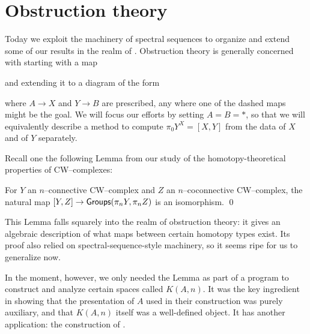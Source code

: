 \section{Obstruction theory}\label{ObstructionSection}

Today we exploit the machinery of spectral sequences to organize and extend some of our results in the realm of .
Obstruction theory is generally concerned with starting with a map
\begin{center}
\end{center}
and extending it to a diagram of the form
\begin{center}
\end{center}
where $A \to X$ and $Y \to B$ are prescribed, any where one of the dashed maps might be the goal.
We will focus our efforts by setting $A = B = *$, so that we will equivalently describe a method to compute $\pi_0 Y^X = [X, Y]$ from the data of $X$ and of $Y$ separately.

Recall one the following Lemma from our study of the homotopy-theoretical properties of CW--complexes:
\begin{lemma}
For $Y$ an $n$--connective CW--complex and $Z$ an $n$--coconnective CW--complex,
the natural map $[Y, Z] \to \mathsf{Groups}(\pi_n Y, \pi_n Z)$ is an isomorphism. \qed
\end{lemma}

\noindent
This Lemma falls squarely into the realm of obstruction theory: it gives an algebraic description of what maps between certain homotopy types exist.
Its proof also relied on spectral-sequence-style machinery, so it seems ripe for us to generalize now.

In the moment, however, we only needed the Lemma as part of a program to construct and analyze certain spaces called $K(A, n)$.
It was the key ingredient in showing that the presentation of $A$ used in their construction was purely auxiliary, and that $K(A, n)$ itself was a well-defined object.
It has another application: the construction of .

